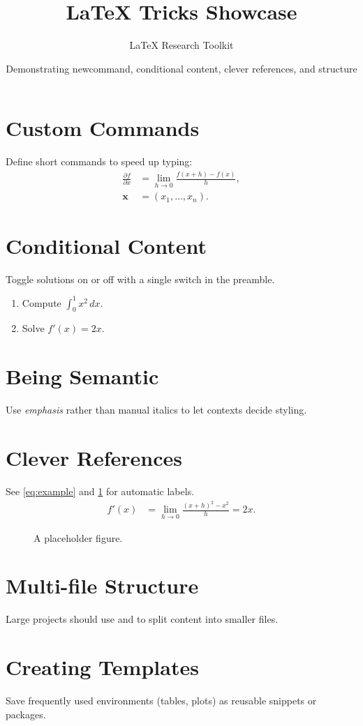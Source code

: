 \documentclass[11pt]{article}
\title{LaTeX Tricks Showcase}
\author{LaTeX Research Toolkit}
\date{Demonstrating newcommand, conditional content, clever references, and structure}
\newcommand{\PD}[2]{\frac{\partial #1}{\partial #2}}
\newcommand{\vect}[1]{\boldsymbol{#1}}
\newif\ifsolution
\begin{document}
\maketitle

\section{Custom Commands}
Define short commands to speed up typing:
\begin{align}
    \PD{f}{x} &= \lim_{h\to 0} \frac{f(x+h)-f(x)}{h},\\
    \vect{x} &= (x_1,\ldots,x_n).
\end{align}

\section{Conditional Content}
Toggle solutions on or off with a single switch in the preamble.
\begin{enumerate}
    \item Compute $\int_0^1 x^2\,dx$.
    \ifsolution
    
    Solution: Using $\int x^2\,dx = x^3/3$, we get $1/3$.
    \fi
    \item Solve $f'(x)=2x$.
    \ifsolution
    
    Solution: $f(x)=x^2 + C$.
    \fi
\end{enumerate}

\section{Being Semantic}
Use \emph{emphasis} rather than manual italics to let contexts decide styling.

\section{Clever References}
See \cref{eq:example} and \cref{fig:parabola} for automatic labels.
\begin{align}
    f'(x) &= \lim_{h\to 0} \frac{(x+h)^2-x^2}{h} = 2x. \label{eq:example}
\end{align}

\begin{figure}[h]
    \centering
    \fbox{\rule{0pt}{1in}\rule{1.5in}{0pt}}
    \caption{A placeholder figure.}
    \label{fig:parabola}
\end{figure}

\section{Multi-file Structure}
Large projects should use \verb++ and \verb++ to split content into smaller files.

\section{Creating Templates}
Save frequently used environments (tables, plots) as reusable snippets or packages.
\end{document}
